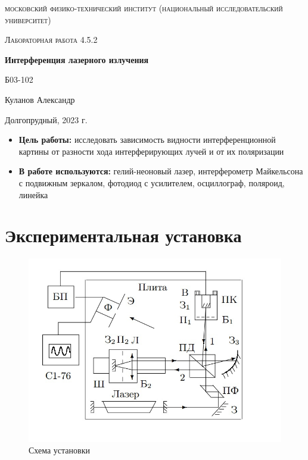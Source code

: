 \documentclass[a4paper, 12pt]{article}
\begin{document}
\begin{titlepage}
	\centering
	\vspace{5cm}
	{\scshape\LARGE московский физико-технический институт (национальный исследовательский университет) \par}
	\vspace{6cm}
	{\scshape\Large Лабораторная работа 4.5.2 \par}
	{\huge\bfseries Интерференция лазерного излучения \par}
	\vspace{1cm}
	\vfill
\begin{flushright}
	{\large Б03-102}\par
	\vspace{0.3cm}
	{\LARGE Куланов Александр}
\end{flushright}
	

	\vfill


	Долгопрудный, 2023 г.
\end{titlepage}

\begin{itemize}
	\item \textbf{Цель работы:} исследовать зависимость видности интерференционной картины от разности хода интерферирующих лучей и от их поляризации
    \item \textbf{В работе используются:} гелий-неоновый лазер, интерферометр Майкельсона с подвижным зеркалом, фотодиод с усилителем, осциллограф, поляроид, линейка
\end{itemize}

\section{Экспериментальная установка}

\begin{figure}[H]
    \centering
    \includegraphics[width=1\textwidth]{set}
    \caption{Схема установки}
    \label{fig:set}
\end{figure}
\end{document}
